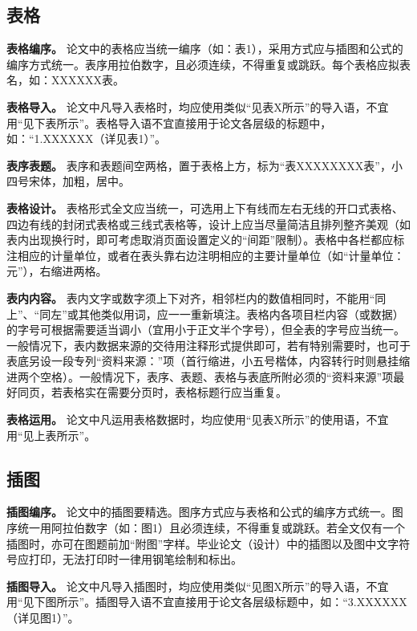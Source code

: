 \documentclass[singlesided]{Style/ucasthesis}%
\begin{document}
\hypertarget{section-26}{%
\subsection{表格}\label{section-26}}

\textbf{表格编序。} 论文中的表格应当统一编序（如：表1），采用方式应与插图和公式的编序方式统一。表序用拉伯数字，且必须连续，不得重复或跳跃。每个表格应拟表名，如：XXXXXX表。

\textbf{表格导入。} 论文中凡导入表格时，均应使用类似``见表X所示''的导入语，不宜用``见下表所示''。表格导入语不宜直接用于论文各层级的标题中，如：``1.XXXXXX（详见表1）''。

\textbf{表序表题。} 表序和表题间空两格，置于表格上方，标为``表XXXXXXXX表''，小四号宋体，加粗，居中。

\textbf{表格设计。} 表格形式全文应当统一，可选用上下有线而左右无线的开口式表格、四边有线的封闭式表格或三线式表格等，设计上应当尽量简洁且排列整齐美观（如表内出现换行时，即可考虑取消页面设置定义的``间距''限制）。表格中各栏都应标注相应的计量单位，或者在表头靠右边注明相应的主要计量单位（如``计量单位：元''），右缩进两格。

\textbf{表内内容。} 表内文字或数字须上下对齐，相邻栏内的数值相同时，不能用``同上''、``同左''或其他类似用词，应一一重新填注。表格内各项目栏内容（或数据）的字号可根据需要适当调小（宜用小于正文半个字号），但全表的字号应当统一。一般情况下，表内数据来源的交待用注释形式提供即可，若有特别需要时，也可于表底另设一段专列``资料来源：''项（首行缩进，小五号楷体，内容转行时则悬挂缩进两个空格）。一般情况下，表序、表题、表格与表底所附必须的``资料来源''项最好同页，若表格实在需要分页时，表格标题行应当重复。

\textbf{表格运用。} 论文中凡运用表格数据时，均应使用``见表X所示''的使用语，不宜用``见上表所示''。

\hypertarget{section-27}{%
\subsection{插图}\label{section-27}}

\textbf{插图编序。} 论文中的插图要精选。图序方式应与表格和公式的编序方式统一。图序统一用阿拉伯数字（如：图1）且必须连续，不得重复或跳跃。若全文仅有一个插图时，亦可在图题前加``附图''字样。毕业论文（设计）中的插图以及图中文字符号应打印，无法打印时一律用钢笔绘制和标出。

\textbf{插图导入。} 论文中凡导入插图时，均应使用类似``见图X所示''的导入语，不宜用``见下图所示''。插图导入语不宜直接用于论文各层级标题中，如：``3.XXXXXX（详见图1）''。
\end{document}
